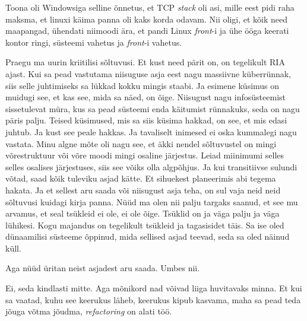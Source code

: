 Toona oli Windowsiga selline õnnetus, et TCP \emph{stack} oli asi, mille eest pidi raha maksma, et linuxi käima panna oli kaks korda odavam. Nii oligi, et kõik need maapangad, ühendati niimoodi ära, et pandi Linux \emph{front}-i ja ühe ööga keerati kontor ringi,  süsteemi vahetus ja  \emph{front}-i vahetus. 


Praegu ma uurin kriitilisi sõltuvusi. Et kust need pärit on, on tegelikult RIA ajast. Kui sa pead vastutama niisuguse asja eest nagu massiivne küberrünnak, siis selle juhtimiseks sa lükkad kokku mingis staabi. Ja esimene küsimus on muidugi see, et kas see, mida sa näed, on õige. Niisugust nagu infosüsteemist sissetulevat müra, kus  sa pead süsteemi enda käitumist rünnakuks, seda on nagu päris palju.  Teised küsimused, mis sa siis küsima hakkad, on see, et mis edasi juhtub. Ja kust see peale hakkas. Ja tavaliselt  inimesed ei oska  kummalegi nagu vastata. Minu algne mõte oli nagu see, et äkki nendel sõltuvustel on mingi võrestruktuur või võre moodi mingi osaline järjestus. Leiad  miinimumi selles selles osalises järjestuses, siis see võiks olla algpõhjus. Ja kui transitiivse sulundi võtad, saad kõik tuleviku asjad kätte. Et sihuekest planeerimis abi tegema hakata. Ja et sellest aru saada või niisugust asja teha, on sul vaja neid neid sõltuvusi kuidagi kirja panna. Nüüd ma olen nii palju targaks saanud, et see mu arvamus, et seal tsükleid ei ole, ei ole õige. Tsüklid on ja väga palju ja väga lühikesi. Kogu majandus on tegelikult tsükleid ja tagasisidet täis.  Sa ise oled dünaamilisi süsteeme õppinud, mida sellised asjad teevad, seda sa oled näinud küll.

Aga nüüd üritan neist asjadest aru saada. Umbes nii.
           
                       
Ei, seda kindlasti mitte. Aga mõnikord nad võivad liiga huvitavaks minna. Et kui sa vaatad, kuhu see keerukus läheb, keerukus kipub kasvama, maha sa pead teda jõuga võtma jõudma, \emph{refactoring} on alati töö.

